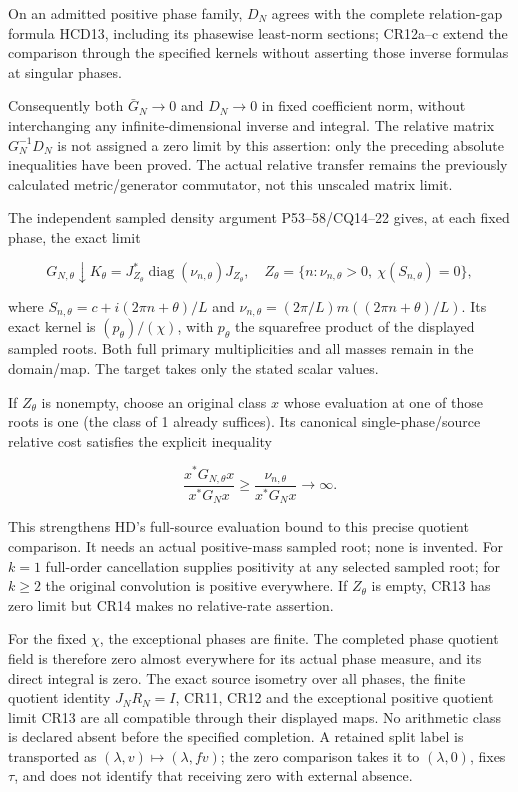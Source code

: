 On an admitted positive phase family, \(D_N\) agrees with the complete relation-gap formula HCD13, including its phasewise least-norm sections; CR12a--c extend the comparison through the specified kernels without asserting those inverse formulas at singular phases.

Consequently both \(\bar G_N\to0\) and \(D_N\to0\) in fixed coefficient norm, without interchanging any infinite-dimensional inverse and integral. The relative matrix \(G_N^{-1}D_N\) is not assigned a zero limit by this assertion: only the preceding absolute inequalities have been proved. The actual relative transfer remains the previously calculated metric/generator commutator, not this unscaled matrix limit.

The independent sampled density argument P53--58/CQ14--22 gives, at each fixed phase, the exact limit

\[
G_{N,\theta}\downarrow K_\theta
=J_{Z_\theta}^*\operatorname{diag}(\nu_{n,\theta})J_{Z_\theta},
\quad Z_\theta=\{n:\nu_{n,\theta}>0,\ \chi(S_{n,\theta})=0\},
\tag{CR13}
\]

where \(S_{n,\theta}=c+i(2\pi n+\theta)/L\) and \(\nu_{n,\theta}=(2\pi/L)m((2\pi n+\theta)/L)\). Its exact kernel is \((p_\theta)/(\chi)\), with \(p_\theta\) the squarefree product of the displayed sampled roots. Both full primary multiplicities and all masses remain in the domain/map. The target takes only the stated scalar values.

If \(Z_\theta\) is nonempty, choose an original class \(x\) whose evaluation at one of those roots is one (the class of 1 already suffices). Its canonical single-phase/source relative cost satisfies the explicit inequality

\[
\frac{x^*G_{N,\theta}x}{x^*G_Nx}
\ge\frac{\nu_{n,\theta}}{x^*G_Nx}\longrightarrow\infty.
\tag{CR14}
\]

This strengthens HD's full-source evaluation bound to this precise quotient comparison. It needs an actual positive-mass sampled root; none is invented. For \(k=1\) full-order cancellation supplies positivity at any selected sampled root; for \(k\ge2\) the original convolution is positive everywhere. If \(Z_\theta\) is empty, CR13 has zero limit but CR14 makes no relative-rate assertion.

For the fixed \(\chi\), the exceptional phases are finite. The completed phase quotient field is therefore zero almost everywhere for its actual phase measure, and its direct integral is zero. The exact source isometry over all phases, the finite quotient identity \(J_NR_N=I\), CR11, CR12 and the exceptional positive quotient limit CR13 are all compatible through their displayed maps. No arithmetic class is declared absent before the specified completion. A retained split label is transported as \((\lambda,v)\mapsto(\lambda,fv)\); the zero comparison takes it to \((\lambda,0)\), fixes \(\tau\), and does not identify that receiving zero with external absence.

